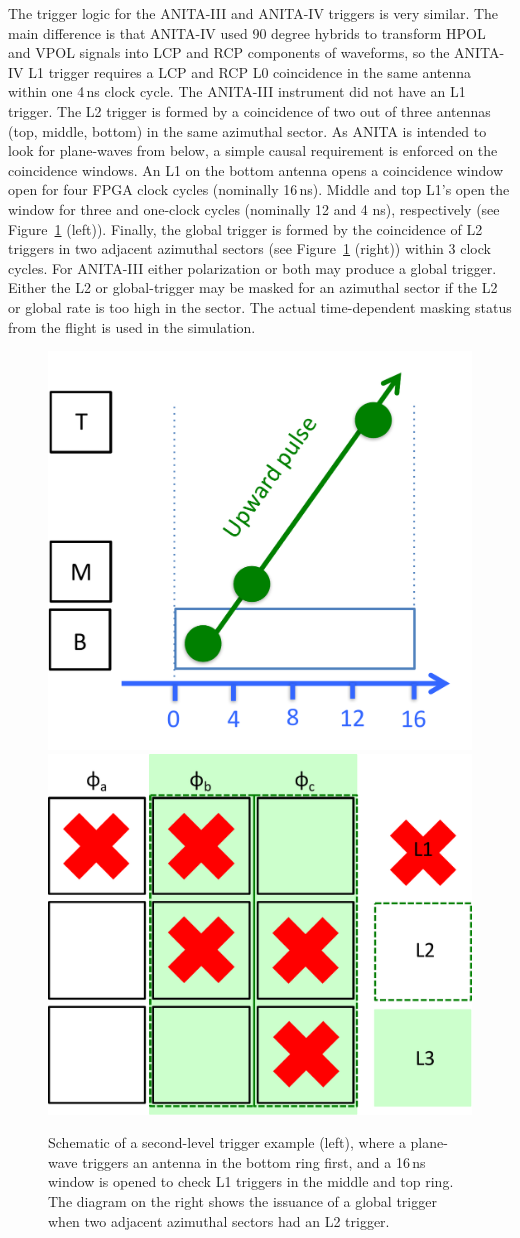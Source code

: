 The trigger logic for the ANITA-III and ANITA-IV triggers is very similar.
The main difference is that ANITA-IV used 90 degree hybrids to transform HPOL and VPOL signals into LCP and RCP components of waveforms, so the ANITA-IV L1 trigger requires a LCP and RCP L0 coincidence in the same antenna within one 4\,ns clock cycle.
The ANITA-III instrument did not have an L1 trigger.
The L2 trigger is formed by a coincidence of two out of three
antennas (top, middle, bottom) in the same azimuthal
sector. As ANITA is intended to look for plane-waves from below, a simple
causal requirement is enforced on the coincidence windows.  An L1 on the bottom
antenna opens a coincidence window open for four FPGA clock cycles (nominally 16\,ns).
Middle and top L1's open the window for three and one-clock cycles (nominally 12 and 4
ns), respectively (see
Figure~\ref{fig:ANITA_triggerLogic} (left)).  
Finally, the global trigger is formed by the coincidence of L2 triggers in
two adjacent azimuthal sectors (see Figure~\ref{fig:ANITA_triggerLogic} (right)) within 3 clock cycles.
For ANITA-III either polarization or both may produce a global trigger. 
Either the L2 or global-trigger may be masked for an
azimuthal sector if the L2 or global rate is too high in the sector.
The actual time-dependent masking status from the flight is used in the simulation.


\begin{figure}[!h]\centering
  \includegraphics[width=.45\linewidth]{./Figs/ANITA3_l1trigger.pdf}
  \includegraphics[width=.45\linewidth]{./Figs/ANITA3_globalTrigger.pdf}
  \caption{Schematic of a second-level trigger example (left), where a
  plane-wave triggers an antenna in the bottom ring first, and a
  16\,ns window is opened to check L1 triggers in the middle and top
  ring.
The diagram on the right shows the issuance of a global trigger when two
adjacent azimuthal sectors had an L2 trigger.}
  \label{fig:ANITA_triggerLogic}
\end{figure}





